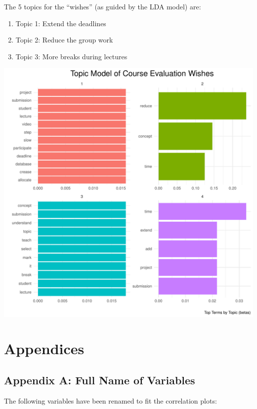 \documentclass[
]{article}
\begin{document}
\newpage

The 5 topics for the ``wishes'' (as guided by the LDA model) are:

\begin{enumerate}
\def\labelenumi{\arabic{enumi}.}
\item
  Topic 1: Extend the deadlines
\item
  Topic 2: Reduce the group work
\item
  Topic 3: More breaks during lectures
\end{enumerate}

\includegraphics{Mid-SemesterCourseEvaluation-20240819-20241125-ADB-BBIT2.2_files/figure-latex/visualizations_for_wishes_topic_modelling-1.pdf}

\newpage

\section{Appendices}\label{appendices}

\subsection{Appendix A: Full Name of
Variables}\label{appendix-a-full-name-of-variables}

The following variables have been renamed to fit the correlation plots:
\end{document}
